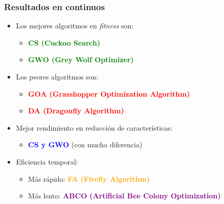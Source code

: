 \begin{frame}
    \frametitle{Resultados en continuos}
    \begin{itemize}
        \item<1-> Los mejores algoritmos en \textit{fitness} son:
            \begin{itemize}
                \item<1-> \textcolor{green}{\textbf{CS (Cuckoo Search)}}
                \item<1-> \textcolor{green}{\textbf{GWO (Grey Wolf Optimizer)}}
            \end{itemize}
        \item<2-> Los peores algoritmos son:
            \begin{itemize}
                \item<2-> \textcolor{red}{\textbf{GOA (Grasshopper Optimization Algorithm)}}
                \item<2-> \textcolor{red}{\textbf{DA (Dragonfly Algorithm)}}
            \end{itemize}
        \item<3-> Mejor rendimiento en reducción de características:
            \begin{itemize}
                \item<3-> \textcolor{blue}{\textbf{CS y GWO}} (con mucha diferencia)
            \end{itemize}
        \item<4-> Eficiencia temporal:
            \begin{itemize}
                \item<4-> Más rápido: \textcolor{orange}{\textbf{FA (Firefly Algorithm)}}
                \item<4-> Más lento: \textcolor{purple}{\textbf{ABCO (Artificial Bee Colony Optimization)}}
            \end{itemize}
    \end{itemize}
\end{frame}


